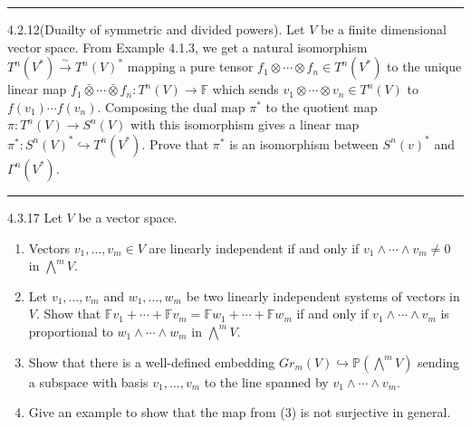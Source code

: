 \documentclass[a4paper, 12pt]{article}
\begin{document}
\noindent\rule{7in}{2.8pt}
\begin{problem}{4.2.12(Duailty of symmetric and divided powers).}
Let \(V\) be a finite dimensional vector space. From Example 4.1.3, we get a natural isomorphism \(T^n(V^*)\xrightarrow{\sim} T^n(V)^*\) mapping a pure tensor 
\(f_1\otimes \cdots\otimes f_n\in T^n(V^*)\) to the unique linear map \(f_1\bar{\otimes} \cdots\bar{\otimes}f_n:T^n(V)\rightarrow \mathbb{F} \) which sends \(v_1\otimes \cdots\otimes v_n\in T^n(V)\) to 
\(f(v_1)\cdots f(v_n)\). Composing the dual map \(\pi^*\) to the quotient map \(\pi:T^n(V)\rightarrow S^n(V)\) with this isomorphism gives a linear map \(\pi^*:S^n(V)^*\hookrightarrow T^n(V^*)\). Prove 
that \(\pi^*\) is an isomorphism between \(S^n(v)^*\) and \(\Gamma^n(V^*)\).
\end{problem}
\begin{solution}
	
\end{solution}

\noindent\rule{7in}{2.8pt}
\begin{problem}{4.3.17}
Let \(V\) be a vector space.
\begin{enumerate}[(1)]
\item Vectors \(v_1,\ldots,v_m\in V\) are linearly independent if and only if \(v_1\wedge \cdots\wedge v_m\neq 0\) in \(\bigwedge^m V\).
\item Let \(v_1,\ldots,v_m\) and \(w_1,\ldots,w_m\) be two linearly independent systems of vectors in \(V\). Show that \(\mathbb{F}v_1+\cdots+\mathbb{F}v_m=\mathbb{F}w_1+\cdots+\mathbb{F}w_m\) 
      if and only if \(v_1\wedge \cdots\wedge v_m\) is proportional to \(w_1\wedge \cdots\wedge w_m\) in \(\bigwedge^m V\).
\item Show that there is a well-defined embedding \(Gr_m(V)\hookrightarrow \mathbb{P}(\bigwedge^m V)\) sending a subspace with basis \(v_1,\ldots,v_m\) to the line spanned by \(v_1\wedge\cdots\wedge v_m\).
\item Give an example to show that the map from (3) is not surjective in general.
\end{enumerate}
\end{problem}
\begin{solution}
	
\end{solution}
\end{document}
